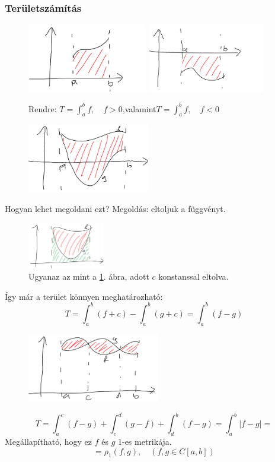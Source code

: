 \documentclass[a4paper,11.5pt]{article}
\begin{document}
	\subsubsection{Területszámítás}
		\begin{figure}[H]
			\centering
			\includegraphics[height=3cm]{kepek/01.png}
			\includegraphics[height=3cm]{kepek/02.png}
			\caption{Rendre: $T=\int_a^bf,\quad f>0$,\quad valamint\quad  $T=\int_a^bf,\quad f<0$}
		\end{figure}
		\begin{figure}[H]
			\centering
			\includegraphics[height=3cm]{kepek/03.png}
			\caption{}\label{eltolatlan-fv}
		\end{figure}
		Hogyan lehet megoldani ezt? Megoldás: eltoljuk a függvényt.
		\begin{figure}[H]
			\centering
			\includegraphics[height=2cm]{kepek/04.png}
			\caption{Ugyanaz az mint a \ref{eltolatlan-fv}. ábra, adott $c$ konstanssal eltolva.}
		\end{figure}
		Így már a terület könnyen meghatározható:
		\[ T=\int_a^b(f+c)-\int_a^b(g+c)=\int_a^b(f-g) \]
		\begin{figure}[H]
			\centering
			\includegraphics[height=3cm]{kepek/05.png}
			\caption{}
		\end{figure}
		\[ T=\int_a^c(f-g)+\int_c^d(g-f)+\int_d^b(f-g)=\int_a^b|f-g|= \]
		Megállapítható, hogy ez $f$ és $g$ 1-es metrikája.
		\[ =\rho_1(f,g),\quad (f,g\in C[a,b]) \]
		
\end{document}

